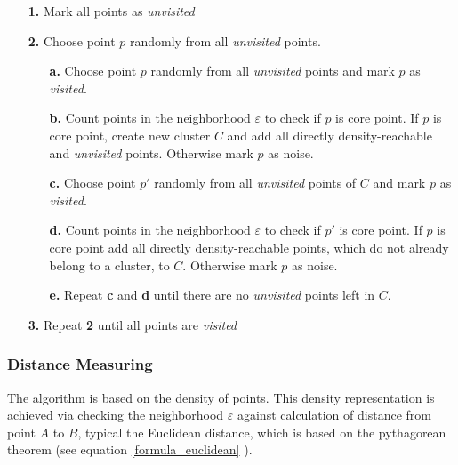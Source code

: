 \documentclass[a4paper,12pt]{report}
\begin{document}
\begin{itemize}
	\item[\textbf{1.}] Mark all points as \textit{unvisited}
	\item[\textbf{2.}] Choose point $p$ randomly from all \textit{unvisited} points.
	\begin{itemize}
		\item[\textbf{a.}] Choose point $p$ randomly from all \textit{unvisited} points and mark $p$ as \textit{visited}.
		\item[\textbf{b.}] Count points in the neighborhood $\varepsilon$ to check if $p$ is core point. If $p$ is core point, create new cluster $C$ and add all directly density-reachable and \textit{unvisited} points. Otherwise mark $p$ as noise.
		\item[\textbf{c.}] Choose point $p'$ randomly from all \textit{unvisited} points of $C$ and mark $p$ as \textit{visited}.
		\item[\textbf{d.}] Count points in the neighborhood $\varepsilon$ to check if $p'$ is core point. If $p$ is core point add all directly density-reachable points, which do not already belong to a cluster, to $C$. Otherwise mark $p$ as noise.
		\item[\textbf{e.}] Repeat \textbf{c} and \textbf{d} until there are no \textit{unvisited} points left in $C$.	
	\end{itemize} 
	\item[\textbf{3.}] Repeat \textbf{2} until all points are \textit{visited} 
\end{itemize}


\subsubsection{Distance Measuring}
The algorithm is based on the density of points. This density representation is achieved via checking the neighborhood $\varepsilon$ against calculation of distance from point $A$ to $B$, typical the Euclidean distance, which is based on the pythagorean theorem (see equation \ref{formula_euclidean} \cite{Erhard2020}).
\end{document}

